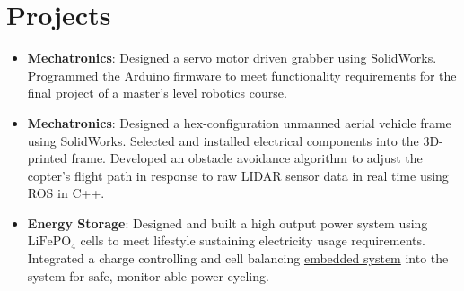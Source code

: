 \documentclass[letterpaper,11pt]{article}
\newcommand{\resumeItem}[2]{
  \item\small{
    \textbf{#1}{: #2 \vspace{-2pt}}
  }
}
\newcommand{\resumeSubItem}[2]{\resumeItem{#1}{#2}\vspace{-4pt}}
\newcommand{\resumeSubHeadingListStart}{\begin{itemize}[leftmargin=*]}
\newcommand{\resumeSubHeadingListEnd}{\end{itemize}}
\begin{document}


\section{Projects}
  \resumeSubHeadingListStart
  \resumeSubItem{Mechatronics}
      {Designed a servo motor driven grabber using SolidWorks. Programmed the Arduino firmware to meet functionality requirements for the final project of a master's level robotics course.}
    \resumeSubItem{Mechatronics}
      {Designed a hex-configuration unmanned aerial vehicle frame using SolidWorks. Selected and installed electrical components into the 3D-printed frame. Developed an obstacle avoidance algorithm to adjust the copter's flight path in response to raw LIDAR sensor data in real time using ROS in C++.}
    \resumeSubItem{Energy Storage}
      {Designed and built a high output power system using $\text{LiFePO}_{\text{4}}$ cells to meet lifestyle sustaining electricity usage requirements. Integrated a charge controlling and cell balancing {\href{https://electrodacus.com/}{embedded system}} into the system for safe, monitor-able power cycling.}
  \resumeSubHeadingListEnd
\end{document}
